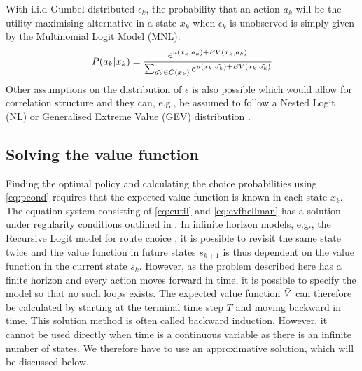 With i.i.d Gumbel distributed $\epsilon_k$, the probability that an action $a_k$ will be the utility maximising alternative in a state $x_k$ when $\epsilon_{k}$ is unobserved is simply given by the Multinomial Logit Model (MNL): 
\newcommand{\akt}{\tilde{a_k}}
\begin{equation} \label{eq:pcond}
P(a_k|x_k) = \frac{e^{\avgu(x_k,a_k) + \eutil(x_k,a_k)}}{\sum_{\akt \in C(x_k)}e^{\avgu(x_k,\akt) + \eutil(x_k,\akt)}}
\end{equation} 
Other assumptions on the distribution of $\epsilon$ is also possible which would allow for correlation structure and they can, e.g., be assumed to follow a Nested Logit (NL) or Generalised Extreme Value (GEV) distribution \citep{mai2015,mai2016method}.


\subsection{Solving the value function}
Finding the optimal policy and calculating the choice probabilities using \eqref{eq:pcond} requires that the expected value function is known in each state $x_k$. The equation system consisting of \eqref{eq:eutil} and \eqref{eq:evfbellman} has a solution under regularity conditions outlined in \citet{Rust88}. In infinite horizon models, e.g., the Recursive Logit model for route choice \citep{fosgerau2013}, it is possible to revisit the same state twice and the value function in future states $s_{k+1}$ is thus dependent on the value function in the current state $s_k$. However, as the problem described here has a finite horizon and every action moves forward in time, it is possible to specify the model so that no such loops exists. The expected value function $\bar{V}$ can therefore be calculated by starting at the terminal time step $T$ and moving backward in time. This solution method is often called backward induction. However, it cannot be used directly when time is a continuous variable as there is an infinite number of states. We therefore have to use an approximative solution, which will be discussed below.

